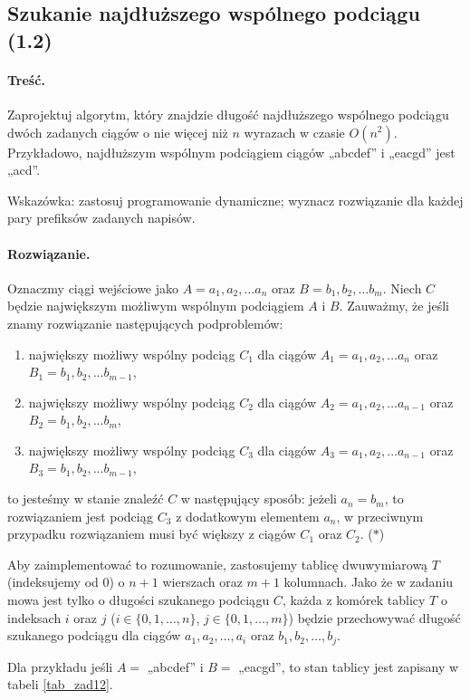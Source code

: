 \subsection{Szukanie najdłuższego wspólnego podciągu (1.2)}
\paragraph{Treść.} Zaprojektuj algorytm, który znajdzie długość najdłuższego wspólnego podciągu dwóch zadanych ciągów
o nie więcej niż $n$ wyrazach w czasie $O(n^2)$. Przykładowo, najdłuższym wspólnym podciągiem 
ciągów „abcdef” i „eacgd” jest „acd”.

Wskazówka: zastosuj programowanie dynamiczne; wyznacz rozwiązanie dla każdej pary prefiksów zadanych napisów.
\paragraph{Rozwiązanie.}
Oznaczmy ciągi wejściowe jako 
$A = a_1, a_2, \dots a_n$ oraz 
$B = b_1, b_2, \dots b_m$. Niech $C$ będzie największym możliwym
wspólnym podciągiem $A$ i $B$.  Zauważmy, że jeśli znamy rozwiązanie
następujących podproblemów:
\begin{enumerate}
	\item największy możliwy wspólny podciąg $C_1$ dla ciągów $A_1=a_1, a_2, \dots a_n$ oraz 
	$B_1=b_1, b_2, \dots b_{m-1}$,
	\item największy możliwy wspólny podciąg $C_2$ dla ciągów $A_2 =a_1, a_2, \dots a_{n-1}$ oraz 
	$B_2=b_1, b_2, \dots b_{m}$,
	\item największy możliwy wspólny podciąg $C_3$ dla ciągów $A_3=a_1, a_2, \dots a_{n-1}$ oraz 
	$B_3=b_1, b_2, \dots b_{m-1}$,
\end{enumerate}
to jesteśmy w stanie znaleźć $C$
w następujący sposób: jeżeli $a_n = b_m$, to rozwiązaniem 
jest podciąg $C_3$ z dodatkowym elementem $a_n$, w przeciwnym przypadku
rozwiązaniem musi być większy z ciągów $C_1$ oraz $C_2$. ($\ast$) 

Aby zaimplementować to rozumowanie, zastosujemy tablicę dwuwymiarową $T$ 
(indeksujemy od 0)
o $n+1$ wierszach oraz $m+1$ kolumnach. Jako że w zadaniu mowa jest 
tylko o długości szukanego podciągu $C$, każda z komórek tablicy $T$ 
o indeksach $i$ oraz $j$ ($i \in \{0,1, \dots, n\}$, 
$j \in \{0,1, \dots, m\}$) będzie 
przechowywać długość szukanego podciągu dla ciągów 
$a_1, a_2, \dots, a_i$ oraz $b_1, b_2, \dots, b_j$. 

Dla przykładu 
jeśli $A = $ „abcdef” i  $B = $ „eacgd”, to stan tablicy jest zapisany w tabeli \ref{tab_zad12}.


